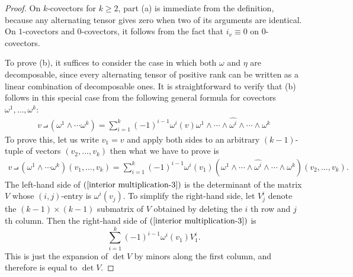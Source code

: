 \begin{proof}
On $k$-covectors for $k\geq2$, part (a) is immediate from the definition, because any alternating tensor gives zero when two of its arguments are identical. On $1$-covectors and $0$-covectors, it follows from the fact that $i_v\equiv0$ on $0$-covectors.\par
To prove (b), it suffices to consider the case in which both $\omega$ and $\eta$ are decomposable, since every alternating tensor of positive rank can be written as a linear combination of decomposable ones. It is straightforward to verify that (b) follows in this special case from the following general formula for covectors $\omega^1,\dots,\omega^k$:
\begin{align}\label{interior multiplication-2}
v\intprod(\omega^1\wedge\cdots\omega^k)=\sum_{i=1}^{k}(-1)^{i-1}\omega^i(v)\omega^1\wedge\cdots\wedge\widehat{\omega^i}\wedge\cdots\wedge\omega^k
\end{align}
To prove this, let us write $v_1=v$ and apply both sides to an arbitrary $(k-1)$-tuple of vectors $(v_2,\dots,v_k)$ then what we have to prove is 
\begin{align}\label{interior multiplication-3}
v\intprod(\omega^1\wedge\cdots\omega^k)(v_1,\dots,v_k)=\sum_{i=1}^{k}(-1)^{i-1}\omega^i(v_1)(\omega^1\wedge\cdots\wedge\widehat{\omega^i}\wedge\cdots\wedge\omega^k)(v_2,\dots,v_k).
\end{align}
The left-hand side of $(\ref{interior multiplication-3})$ is the determinant of the matrix $V$ whose $(i,j)$-entry is $\omega^i(v_j)$. To simplify the right-hand side, let $V^i_j$ denote the $(k-1)\times(k-1)$ submatrix of $V$ obtained by deleting the $i$ th row and $j$ th column. Then the right-hand side of $(\ref{interior multiplication-3})$ is
\[\sum_{i=1}^{k}(-1)^{i-1}\omega^i(v_1)V^i_1.\]
This is just the expansion of $\det V$ by minors along the first column, and therefore is equal to $\det V$.
\end{proof}
